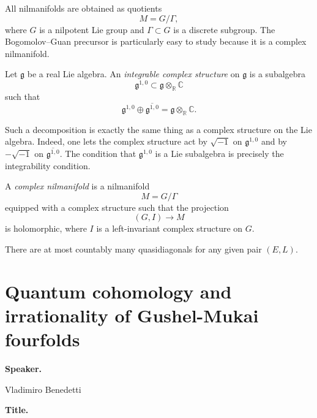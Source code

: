 \begin{remark}
\label{remark-all-nilmanifolds2-duplicate-2}
All nilmanifolds are obtained as
quotients
\[
M=G/\Gamma,
\]
where $G$ is a nilpotent Lie group
and $\Gamma\subset G$ is a discrete
subgroup.
The Bogomolov--Guan precursor is
particularly easy to study because it
is a complex nilmanifold.
\end{remark}

\begin{definition}
\label{definition-let-g4-duplicate-2}
Let $\mathfrak g$ be a real Lie
algebra.
An {\it integrable complex structure}
on $\mathfrak g$ is a subalgebra
\[
\mathfrak g^{1,0}
\subset
\mathfrak g\otimes_{\mathbb{R}}
\mathbb{C}
\]
such that
\[
\mathfrak g^{1,0}\oplus
\overline{\mathfrak g^{1,0}}
=
\mathfrak g\otimes_{\mathbb{R}}
\mathbb{C}.
\]
\end{definition}

\begin{remark}
\label{remark-such-decomposition2-duplicate-2}
Such a decomposition is exactly the
same thing as a complex structure on
the Lie algebra.
Indeed, one lets the complex structure
act by $\sqrt{-1}$ on
$\mathfrak g^{1,0}$ and by
$-\sqrt{-1}$ on
$\overline{\mathfrak g^{1,0}}$.
The condition that $\mathfrak g^{1,0}$
is a Lie subalgebra is precisely the
integrability condition.
\end{remark}

\begin{definition}
\label{definition-complex2-duplicate-2}
A {\it complex nilmanifold} is a
nilmanifold
\[
M=G/\Gamma
\]
equipped with a complex structure such
that the projection
\[
(G,I)\to M
\]
is holomorphic, where $I$ is a
left-invariant complex structure on
$G$.
\end{definition}

\begin{theorem}
\label{theorem-most-countably}
There are at most countably many
quasidiagonals for any given pair
$(E,L)$.
\end{theorem}

\section{Quantum cohomology and
irrationality of
Gushel-Mukai fourfolds}
\label{section-quantum-cohomology-gm}

\medskip\noindent
{\bf Speaker.}

Vladimiro Benedetti

\medskip\noindent
{\bf Title.}

